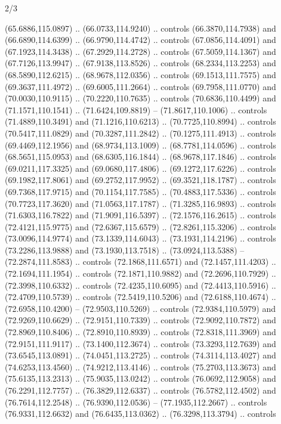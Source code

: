 \begin{flagdescription}{2/3}
\begin{scope}[shift={(0.5\flaglength,0.5)},scale=\flagwidth/320]
\begin{scope}[y=0.8pt, x=0.8pt, yscale=-1,shift={(-118.3,-146)}]
  (65.6886,115.0897) .. (66.0733,114.9240) .. controls (66.3870,114.7938) and
  (66.6890,114.6399) .. (66.9790,114.4742) .. controls (67.0856,114.4091) and
  (67.1923,114.3438) .. (67.2929,114.2728) .. controls (67.5059,114.1367) and
  (67.7126,113.9947) .. (67.9138,113.8526) .. controls (68.2334,113.2253) and
  (68.5890,112.6215) .. (68.9678,112.0356) .. controls (69.1513,111.7575) and
  (69.3637,111.4972) .. (69.6005,111.2664) .. controls (69.7958,111.0770) and
  (70.0030,110.9115) .. (70.2220,110.7635) .. controls (70.6836,110.4499) and
  (71.1571,110.1541) .. (71.6424,109.8819) -- (71.8617,110.1006) .. controls
  (71.4889,110.3491) and (71.1216,110.6213) .. (70.7725,110.8994) .. controls
  (70.5417,111.0829) and (70.3287,111.2842) .. (70.1275,111.4913) .. controls
  (69.4469,112.1956) and (68.9734,113.1009) .. (68.7781,114.0596) .. controls
  (68.5651,115.0953) and (68.6305,116.1844) .. (68.9678,117.1846) .. controls
  (69.0211,117.3325) and (69.0680,117.4806) .. (69.1272,117.6226) .. controls
  (69.1982,117.8061) and (69.2752,117.9952) .. (69.3521,118.1787) .. controls
  (69.7368,117.9715) and (70.1154,117.7585) .. (70.4883,117.5336) .. controls
  (70.7723,117.3620) and (71.0563,117.1787) .. (71.3285,116.9893) .. controls
  (71.6303,116.7822) and (71.9091,116.5397) .. (72.1576,116.2615) .. controls
  (72.4121,115.9775) and (72.6367,115.6579) .. (72.8261,115.3206) .. controls
  (73.0096,114.9774) and (73.1339,114.6043) .. (73.1931,114.2196) .. controls
  (73.2286,113.9888) and (73.1930,113.7518) .. (73.0924,113.5388) --
  (72.2874,111.8583) .. controls (72.1868,111.6571) and (72.1457,111.4203) ..
  (72.1694,111.1954) .. controls (72.1871,110.9882) and (72.2696,110.7929) ..
  (72.3998,110.6332) .. controls (72.4235,110.6095) and (72.4413,110.5916) ..
  (72.4709,110.5739) .. controls (72.5419,110.5206) and (72.6188,110.4674) ..
  (72.6958,110.4200) -- (72.9503,110.5269) .. controls (72.9384,110.5979) and
  (72.9269,110.6629) .. (72.9151,110.7339) .. controls (72.9092,110.7872) and
  (72.8969,110.8406) .. (72.8910,110.8939) .. controls (72.8318,111.3969) and
  (72.9151,111.9117) .. (73.1400,112.3674) .. controls (73.3293,112.7639) and
  (73.6545,113.0891) .. (74.0451,113.2725) .. controls (74.3114,113.4027) and
  (74.6253,113.4560) .. (74.9212,113.4146) .. controls (75.2703,113.3673) and
  (75.6135,113.2313) .. (75.9035,113.0242) .. controls (76.0692,112.9058) and
  (76.2291,112.7757) .. (76.3829,112.6337) .. controls (76.5782,112.4502) and
  (76.7614,112.2548) .. (76.9390,112.0536) -- (77.1935,112.2667) .. controls
  (76.9331,112.6632) and (76.6435,113.0362) .. (76.3298,113.3794) .. controls

\end{scope}
\end{scope}
\end{flagdescription}
